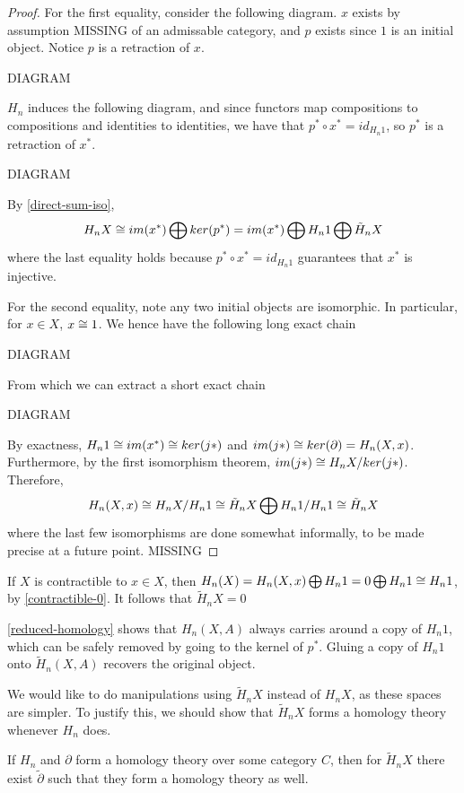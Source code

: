 \begin{proof}
For the first equality, consider the following diagram. $x$ exists by assumption MISSING of an admissable category, and $p$ exists since $1$ is an initial object. Notice $p$ is a retraction of $x$.

DIAGRAM

$H_n$ induces the following diagram, and since functors map compositions to compositions and identities to identities, we have that $p^*\circ x^*=id_{H_n1}$, so $p^*$ is a retraction of $x^*$.

DIAGRAM

By \ref{direct-sum-iso}, $$H_nX\cong im(x^*)\bigoplus ker(p^*)=im(x^*)\bigoplus H_n1\bigoplus \tilde{H}_nX$$
where the last equality holds because $p^*\circ x^* = id_{H_n1}$ guarantees that $x^*$ is injective.

For the second equality, note any two initial objects are isomorphic. In particular, for $x\in X$, $x\cong 1$. We hence have the following long exact chain

DIAGRAM

From which we can extract a short exact chain

DIAGRAM

By exactness, $H_n1\cong im(x^*)\cong ker(j*)$ and $im(j*)\cong ker(\partial)=H_n(X,x)$. Furthermore, by the first isomorphism theorem, $im(j*)\cong H_nX/ker(j*)$. Therefore, $$H_n(X,x)\cong H_nX/H_n1\cong \tilde{H}_nX\bigoplus H_n1/H_n1 \cong \tilde{H}_nX$$
where the last few isomorphisms are done somewhat informally, to be made precise at a future point. MISSING
\end{proof}

\begin{corollary}
If $X$ is contractible to $x\in X$, then $H_n(X)=H_n(X,x)\bigoplus H_n1=0\bigoplus H_n1\cong H_n1$, by \ref{contractible-0}. It follows that $\tilde{H}_nX=0$
\end{corollary}

\ref{reduced-homology} shows that $H_n(X,A)$ always carries around a copy of $H_n1$, which can be safely removed by going to the kernel of $p^*$. Gluing a copy of $H_n1$ onto $\tilde{H}_n(X,A)$ recovers the original object.

We would like to do manipulations using $\tilde{H}_nX$ instead of $H_n X$, as these spaces are simpler. To justify this, we should show that $\tilde{H}_n X$ forms a homology theory whenever $H_n$ does.

\begin{theorem}
If $H_n$ and $\partial$ form a homology theory over some category $C$, then for $\tilde{H}_nX$ there exist $\tilde{\partial}$ such that they form a homology theory as well.
\end{theorem}